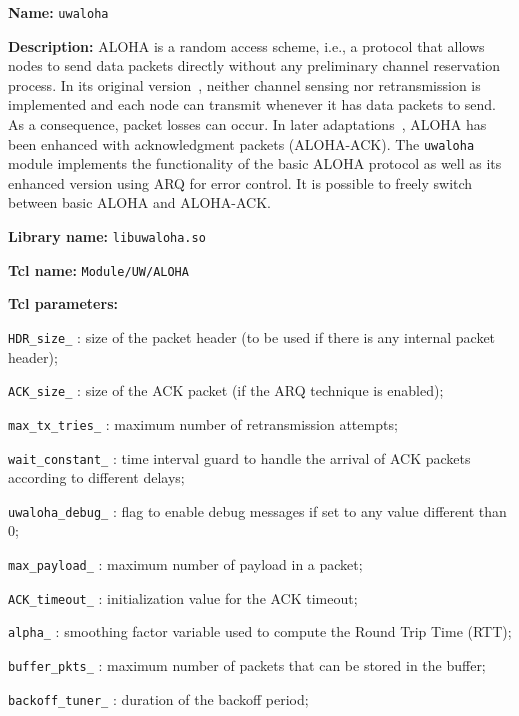 \vspace{1 cm}

\begin{description}
   \item {\bf Name:} {\tt uwaloha}
   \item {\bf Description:} ALOHA is a random access scheme, i.e., a protocol that allows nodes to send data packets directly without any preliminary channel reservation process. In its original version~\cite{Abramson85}, neither channel sensing nor retransmission is implemented and each node can transmit whenever it has data packets to send. As a consequence, packet losses can occur. In later adaptations~\cite{GuoSingapore}, ALOHA has been enhanced with acknowledgment packets (ALOHA-ACK). The {\tt uwaloha} module implements the functionality of the basic ALOHA protocol as well as its enhanced version using ARQ for error control. It is possible to freely switch between basic ALOHA and ALOHA-ACK.
   \item {\bf Library name:} {\tt libuwaloha.so} 
   \item {\bf Tcl name:} {\tt Module/UW/ALOHA}
   \item {\bf Tcl parameters:} 
    \begin{description}
     \item {\tt HDR\_size\_} : size of the packet header (to be used if there is any internal packet header);
     \item {\tt ACK\_size\_} : size of the ACK packet (if the ARQ technique is enabled);
     \item {\tt max\_tx\_tries\_} : maximum number of retransmission attempts;
     \item {\tt wait\_constant\_} : time interval guard to handle the arrival of ACK packets according to different delays;
     \item {\tt uwaloha\_debug\_} : flag to enable debug messages if set to any value different than $0$;
     \item {\tt max\_payload\_} : maximum number of payload in a packet;
     \item {\tt ACK\_timeout\_} : initialization value for the ACK timeout;
     \item {\tt alpha\_} : smoothing factor variable used to compute the Round Trip Time (RTT);
     \item {\tt buffer\_pkts\_} : maximum number of packets that can be stored in the buffer;
     \item {\tt backoff\_tuner\_} : duration of the backoff period;

\end{description}
\end{description}
